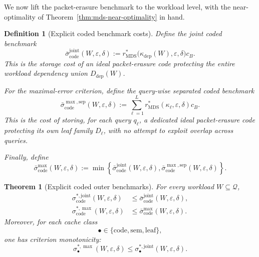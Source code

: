 \documentclass[journal]{IEEEtran}
\newtheorem{theorem}{Theorem}[section]
\newtheorem{definition}{Definition}[section]
\numberwithin{equation}{section}
\begin{document}
We now lift the packet-erasure benchmark to the workload level, with the
near-optimality of Theorem~\ref{thm:mds-near-optimality} in hand.

\begin{definition}[Explicit coded benchmark costs]
\label{def:explicit-coded-benchmarks}
Define the joint coded benchmark
\begin{equation}
  \bar{\sigma}_{\mathrm{code}}^{\mathrm{joint}}
  (W,\varepsilon,\delta)
  :=
  r_{\mathrm{MDS}}^*\bigl(\kappa_{\mathrm{dep}}(W),\varepsilon,\delta\bigr)c_B.
\label{eq:def-coded-benchmark-joint}
\end{equation}
This is the storage cost of an ideal packet-erasure code protecting the entire
workload dependency union \(D_{\mathrm{dep}}(W)\).

For the maximal-error criterion, define the query-wise separated coded
benchmark
\begin{equation}
  \bar{\sigma}_{\mathrm{code}}^{\max,\mathrm{sep}}
  (W,\varepsilon,\delta)
  :=
  \sum_{\ell=1}^{L}
  r_{\mathrm{MDS}}^*(\kappa_\ell,\varepsilon,\delta)c_B.
\label{eq:def-coded-benchmark-max-sep}
\end{equation}
This is the cost of storing, for each query \(q_\ell\), a dedicated ideal
packet-erasure code protecting its own leaf family \(D_\ell\), with no attempt
to exploit overlap across queries.

Finally, define
\begin{equation}
  \bar{\sigma}_{\mathrm{code}}^{\max}
  (W,\varepsilon,\delta)
  :=
  \min\left\{
    \bar{\sigma}_{\mathrm{code}}^{\mathrm{joint}}
    (W,\varepsilon,\delta),
    \bar{\sigma}_{\mathrm{code}}^{\max,\mathrm{sep}}
    (W,\varepsilon,\delta)
  \right\}.
\label{eq:def-coded-benchmark-max}
\end{equation}
\end{definition}

\begin{theorem}[Explicit coded outer benchmarks]
\label{thm:explicit-coded-outer-benchmarks}
For every workload \(W\subseteq\mathcal Q\),
\begin{align}
  \sigma_{\mathrm{code}}^{*,\mathrm{joint}}
  (W,\varepsilon,\delta)
  &\le
  \bar{\sigma}_{\mathrm{code}}^{\mathrm{joint}}
  (W,\varepsilon,\delta),
\label{eq:coded-joint-benchmark-bound}\\
  \sigma_{\mathrm{code}}^{*,\max}
  (W,\varepsilon,\delta)
  &\le
  \bar{\sigma}_{\mathrm{code}}^{\max}
  (W,\varepsilon,\delta).
\label{eq:coded-max-benchmark-bound}
\end{align}
Moreover, for each cache class
\[
  \bullet\in\{\mathrm{code},\mathrm{sem},\mathrm{leaf}\},
\]
one has criterion monotonicity:
\begin{equation}
  \sigma_{\bullet}^{*,\max}(W,\varepsilon,\delta)
  \le
  \sigma_{\bullet}^{*,\mathrm{joint}}(W,\varepsilon,\delta).
\label{eq:criterion-monotonicity}
\end{equation}
\end{theorem}
\end{document}
